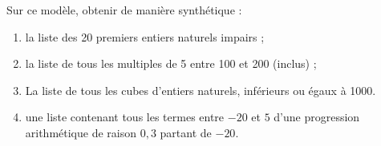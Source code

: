 \begin{pyverbatim}
\end{pyverbatim}
Sur ce modèle, obtenir de manière synthétique : 
\begin{enumerate}[label=\emph{\alph*)}]
  \item la liste des 20 premiers entiers naturels impairs ;
  \item la liste de tous les multiples de 5 entre 100 et 200 (inclus) ;
  \item La liste de tous les cubes d'entiers naturels, inférieurs ou égaux à 1000. 
  \item une liste contenant tous les termes entre $-20$ et $5$ d'une progression arithmétique de raison $0,3$ partant de $-20$.
\end{enumerate}